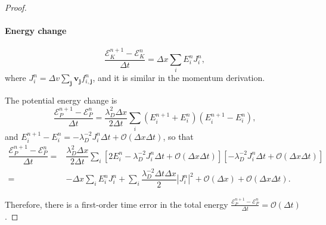 \documentclass[10pt,a4paper]{amsart}
\newcommand{\cO}{\mathcal{O}}
\begin{document}
\begin{proof}
\paragraph{Energy change}

\begin{equation}
    \dfrac{\mathcal E_K^{n+1}-\mathcal E_K^n}{\Delta t} = \Delta x \sum_{i} E_{i}^{n} J_{i}^{n},
\end{equation}
where $J_{i}^{n} = \Delta v \sum_{\bm{j}} \bm{v}_{\bm{j}} f_{i,\bm{j}}^{n}$, and it is similar in the momentum derivation.

The potential energy change is 
\begin{equation}
    \dfrac{\mathcal{E}_{P}^{n+1}-\mathcal{E}_{P}^n}{\Delta t} = \dfrac{\lambda_{D}^{2} \Delta x}{2 \Delta t} \sum_{i} (E_{i}^{n+1} + E_{i}^{n}) (E_{i}^{n+1} - E_{i}^{n}) ,
\end{equation}
and $E_{i}^{n+1} - E_{i}^{n} = - \lambda_{D}^{-2} J_{i}^{n} \Delta t + \cO(\Delta x \Delta t)$,
so that 
\begin{equation}
\begin{aligned}
    \dfrac{\mathcal{E}_{P}^{n+1}-\mathcal{E}_{P}^{n}}{\Delta t} =& \dfrac{\lambda_{D}^{2} \Delta x}{2 \Delta t} \sum_{i} [2E_{i}^{n} - \lambda_{D}^{-2} J_{i}^{n} \Delta t + \cO(\Delta x \Delta t)] [- \lambda_{D}^{-2} J_{i}^{n} \Delta t + \cO(\Delta x \Delta t)] \\
    =& - \Delta x \sum_{i} E_{i}^{n} J_{i}^{n} + \sum_{i} \dfrac{\lambda_{D}^{-2} \Delta t \Delta x}{2} |J_{i}^{n}|^{2} + \cO(\Delta x) + \cO(\Delta x \Delta t) .
\end{aligned}
\end{equation}

Therefore, there is a first-order time error in the total energy $\frac{\mathcal{E}_{P}^{n+1}-\mathcal{E}_{P}^{n}}{\Delta t} = \cO(\Delta t)$.




\end{proof}
\end{document}
